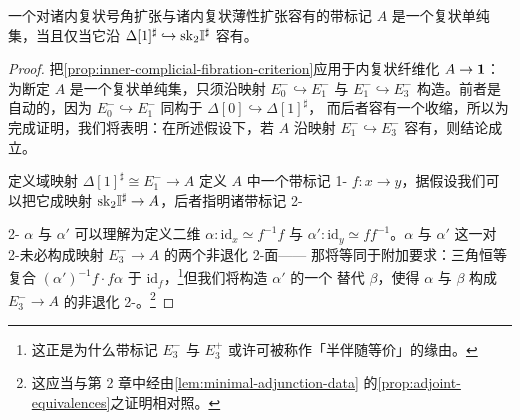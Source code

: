 \begin{corollary}\label{cor:inner-fillings-complicial-set}
一个对诸内复状号角扩张与诸内复状薄性扩张容有\trFiller{}的带标记\trSimplicialSet
$A$ 是一个复状单纯集，当且仅当它沿 $\Delta[1]^{\sharp}\hookrightarrow\mathrm{sk}_{2}\mathbb{I}^{\sharp}$
容有\trExtension。
\end{corollary}

\begin{proof}
把\cref{prop:inner-complicial-fibration-criterion}应用于内复状纤维化
$A\to\mathbf{1}$：为断定 $A$ 是一个复状单纯集，只须沿映射 $E_{0}^{-}\hookrightarrow E_{1}^{-}$
与 $E_{1}^{-}\hookrightarrow E_{3}^{-}$ 构造\trExtension。前者是自动的，因为
$E_{0}^{-}\hookrightarrow E_{1}^{-}$ 同构于 $\Delta[0]\hookrightarrow\Delta[1]^{\sharp}$，
而后者容有一个收缩，所以为完成证明，我们将表明：在所述假设下，若 $A$ 沿映射
$E_{1}^{-}\hookrightarrow E_{3}^{-}$ 容有\trExtension，则结论成立。

定义域映射 $\Delta[1]^{\sharp}\cong E_{1}^{-}\to A$ 定义 $A$ 中一个带标记
1-\trSimplex{} $f\colon x\to y$，据假设我们可以把它\trExtension{}成映射
$\mathrm{sk}_{2}\mathbb{I}^{\sharp}\to A$，后者指明诸带标记 2-\trSimplex
\begin{center}
\qquad
{}
\end{center}
2-\trSimplex{} $\alpha$ 与 $\alpha'$ 可以理解为定义二维\trEquivalence{}
$\alpha\colon\mathrm{id}_{x}\simeq f^{-1}f$ 与
$\alpha'\colon\mathrm{id}_{y}\simeq ff^{-1}$。$\alpha$ 与 $\alpha'$ 这一对
2-\trSimplex{}未必构成映射 $E_{3}^{-}\to A$ 的两个非退化 2-\trSimplex{}面——
那将等同于附加要求：三角恒等复合 $(\alpha')^{-1}f\cdot f\alpha$ \trEquivalence{}%
于 $\mathrm{id}_{f}$，\footnote{这正是为什么带标记\trSimplicialSet{} $E_{3}^{-}$
与 $E_{3}^{+}$ 或许可被称作「半伴随等价」的缘由。}但我们将构造 $\alpha'$ 的一个
替代 $\beta$，使得 $\alpha$ 与 $\beta$ 构成 $E_{3}^{-}\to A$ 的非退化
2-\trSimplex。\footnote{这应当与第 2 章中经由\cref{lem:minimal-adjunction-data}
的\cref{prop:adjoint-equivalences}之证明相对照。}


\end{proof}
